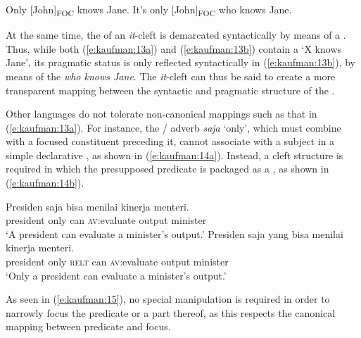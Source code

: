\documentclass[output=paper]{langsci/langscibook}
\begin{document}
\begin{exe}
	\ex\label{e:kaufman:13}
	\begin{xlist}
		\ex\label{e:kaufman:13a} Only {[John]}\textsubscript{FOC} knows Jane.
		\ex\label{e:kaufman:13b} It's only {[John]}\textsubscript{FOC} who knows Jane.
	\end{xlist}
\end{exe}

\noindent
At the same time, the  of an  \textit{it}-cleft is demarcated syntactically by means of a . Thus, while both (\ref{e:kaufman:13a}) and (\ref{e:kaufman:13b}) contain a  `X knows Jane', its pragmatic status is only reflected syntactically in (\ref{e:kaufman:13b}), by means of the  \textit{who knows Jane}. The  \textit{it}-cleft can thus be said to create a more transparent mapping between the syntactic and pragmatic structure of the .

Other languages do not tolerate non-canonical mappings such as that in (\ref{e:kaufman:13a}). For instance, the / adverb \textit{saja} `only', which must combine with a focused constituent preceding it, cannot associate with a subject in a simple declarative , as shown in (\ref{e:kaufman:14a}). Instead, a cleft structure is required in which the presupposed predicate is packaged as a , as shown in (\ref{e:kaufman:14b}).  

\begin{exe}
	\ex\label{e:kaufman:14}
	\begin{xlist}
		\exi{Indonesian}
		\ex\label{e:kaufman:14a}
        \gll Presiden {\USOParen}{\USStar}saja{\USCParen} bisa menilai kinerja menteri.\\
		president \phantom{(*}only can \textsc{av:}evaluate output minister\\
		\glt `A president can evaluate a minister's output.'
		\ex\label{e:kaufman:14b}
        \gll Presiden saja yang bisa menilai kinerja menteri.\\
		president only \textsc{relt} can \textsc{av:}evaluate output minister\\
		\glt `Only a president can evaluate a minister's output.'
	\end{xlist}
\end{exe}

\noindent
As seen in (\ref{e:kaufman:15}), no special manipulation is required in order to narrowly focus the predicate or a part thereof, as this respects the canonical mapping between predicate and focus.
\end{document}
